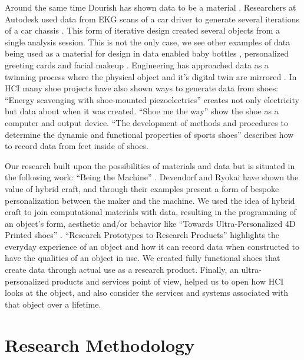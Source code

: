 Around the same time Dourish has shown data to be a material \cite{Dourish2017}. Researchers at Autodesk used data from EKG scans of a car driver to generate several iterations of a car chassis \cite{Nourbakhsh2016}. This form of iterative design created several objects from a single analysis session. This is not the only case, we see other examples of data being used as a material for design in data enabled baby bottles \cite{Bogers2016}, personalized greeting cards \cite{Benford2017} and facial makeup \cite{kao2016duoskin}. Engineering has approached data as a twinning process where the physical object and it's digital twin are mirrored \cite{Tao2018}. In HCI many shoe projects have also shown ways to generate data from shoes: ``Energy scavenging with shoe-mounted piezoelectrics'' \cite{Shenck2001} creates not only electricity but data about when it was created. ``Shoe me the way'' \cite{Schirmer2015} show the shoe as a computer and output device. ``The development of methods and procedures to determine the dynamic and functional properties of sports shoes'' \cite{Vertommen2011} describes how to record data from feet inside of shoes.  


Our research built upon the possibilities of materials and data but is situated in the following work: ``Being the Machine'' \cite{Devendorf2015}. Devendorf and Ryokai have shown the value of hybrid craft, and through their examples present a form of bespoke personalization between the maker and the machine. We used the idea of hybrid craft to join computational materials with data, resulting in the programming of an object's form, aesthetic and/or behavior like ``Towards Ultra-Personalized 4D Printed shoes'' \cite{nachtigall2018towards}.  ``Research Prototypes to Research Products'' \cite{Odom2016} highlights the everyday experience of an object and how it can record data when constructed to have the qualities of an object in use. We created fully functional shoes that create data through actual use as a research product. Finally, an ultra-personalized products and services \cite{Bhomer2016} point of view, helped us to open how HCI looks at the object, and also consider the services and systems associated with that object over a lifetime. 

\section{Research Methodology}



